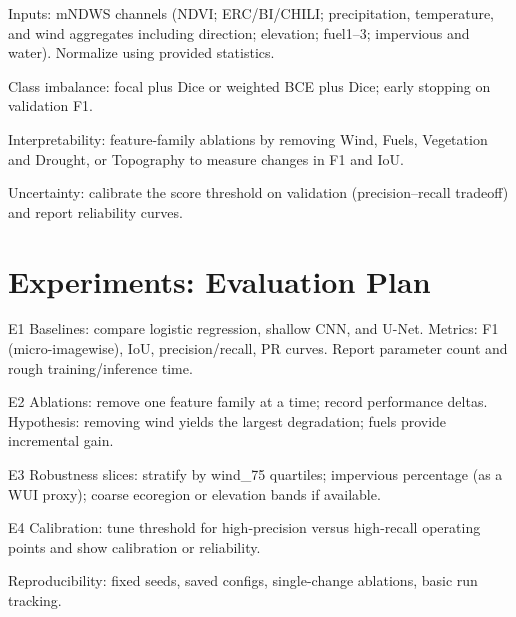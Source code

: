 \documentclass[conference]{IEEEtran}
\begin{document}
Inputs: mNDWS channels (NDVI; ERC/BI/CHILI; precipitation, temperature, and wind aggregates including direction; elevation; fuel1--3; impervious and water). Normalize using provided statistics.

Class imbalance: focal plus Dice or weighted BCE plus Dice; early stopping on validation F1.

Interpretability: feature-family ablations by removing Wind, Fuels, Vegetation and Drought, or Topography to measure changes in F1 and IoU.

Uncertainty: calibrate the score threshold on validation (precision–recall tradeoff) and report reliability curves.

\section{Experiments: Evaluation Plan}
E1 Baselines: compare logistic regression, shallow CNN, and U-Net. Metrics: F1 (micro-imagewise), IoU, precision/recall, PR curves. Report parameter count and rough training/inference time.

E2 Ablations: remove one feature family at a time; record performance deltas. Hypothesis: removing wind yields the largest degradation; fuels provide incremental gain.

E3 Robustness slices: stratify by wind\_75 quartiles; impervious percentage (as a WUI proxy); coarse ecoregion or elevation bands if available.

E4 Calibration: tune threshold for high-precision versus high-recall operating points and show calibration or reliability.

Reproducibility: fixed seeds, saved configs, single-change ablations, basic run tracking.
\end{document}
